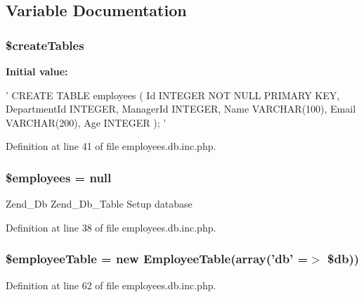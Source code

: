 \subsection{\-Variable \-Documentation}
\hypertarget{employees_8db_8inc_8php_a357d57bd32f1b2ca29a9674741f44fd3}{
\subsubsection[{\$create\-Tables}]{\setlength{\rightskip}{0pt plus 5cm}\$create\-Tables}}\label{employees_8db_8inc_8php_a357d57bd32f1b2ca29a9674741f44fd3}
{\bfseries \-Initial value\-:}
\begin{DoxyCode}
 '
        CREATE TABLE employees (
                Id                      INTEGER NOT NULL PRIMARY KEY,
                DepartmentId    INTEGER,
                ManagerId               INTEGER,
                Name                    VARCHAR(100),
                Email                   VARCHAR(200),
                Age                             INTEGER
        );
'
\end{DoxyCode}


\-Definition at line 41 of file employees.\-db.\-inc.\-php.

\hypertarget{employees_8db_8inc_8php_a598c06abe9d65a9d2990e39693ce2c27}{
\subsubsection[{\$employees}]{\setlength{\rightskip}{0pt plus 5cm}\$employees = null}}\label{employees_8db_8inc_8php_a598c06abe9d65a9d2990e39693ce2c27}
\-Zend\-\_\-\-Db \-Zend\-\_\-\-Db\-\_\-\-Table \-Setup database 

\-Definition at line 38 of file employees.\-db.\-inc.\-php.

\hypertarget{employees_8db_8inc_8php_a70a2050a9df43e30a61a4d25945cf666}{
\subsubsection[{\$employee\-Table}]{\setlength{\rightskip}{0pt plus 5cm}\$employee\-Table = new {\bf \-Employee\-Table}(array('db' =$>$ \$db))}}\label{employees_8db_8inc_8php_a70a2050a9df43e30a61a4d25945cf666}


\-Definition at line 62 of file employees.\-db.\-inc.\-php.

